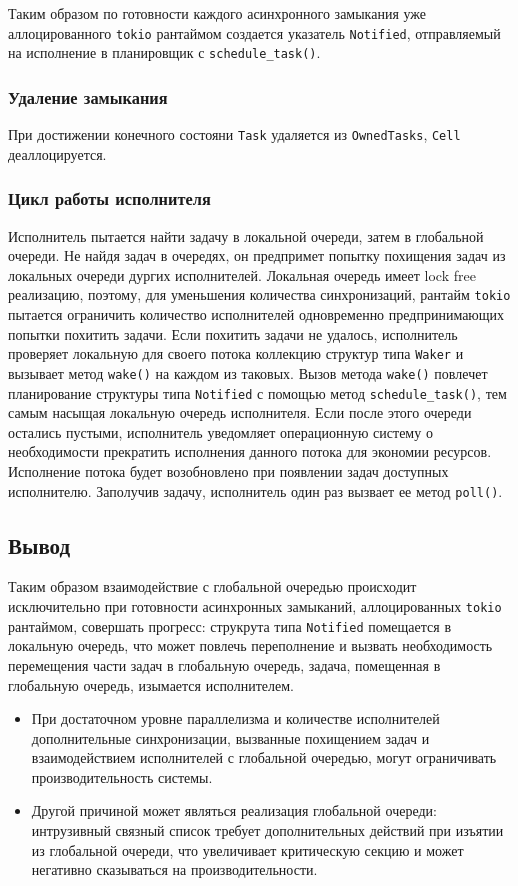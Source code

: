 Таким образом по готовности каждого асинхронного замыкания уже аллоцированного \verb|tokio| рантаймом создается указатель \verb|Notified|, отправляемый на исполнение в планировщик с \verb|schedule_task()|.

\subsubsection{Удаление замыкания}

При достижении конечного состояни \verb|Task| удаляется из \verb|OwnedTasks|, \verb|Cell| деаллоцируется.

\subsubsection{Цикл работы исполнителя}

Исполнитель пытается найти задачу в локальной очереди, затем в глобальной очереди. Не найдя задач в очередях, он предпримет попытку похищения задач из локальных очереди дургих исполнителей. Локальная очередь имеет lock free реализацию, поэтому, для уменьшения количества синхронизаций, рантайм \verb|tokio| пытается ограничить количество исполнителей одновременно предпринимающих попытки похитить задачи. Если похитить задачи не удалось, исполнитель проверяет локальную для своего потока коллекцию структур типа \verb|Waker| и вызывает метод \verb|wake()| на каждом из таковых. Вызов метода \verb|wake()| повлечет планирование структуры типа \verb|Notified| с помощью метод \verb|schedule_task()|, тем самым насыщая локальную очередь исполнителя. Если после этого очереди остались пустыми, исполнитель уведомляет операционную систему о необходимости прекратить исполнения данного потока для экономии ресурсов. Исполнение потока будет возобновлено при появлении задач доступных исполнителю. Заполучив задачу, исполнитель один раз вызвает ее метод \verb|poll()|.

\subsection{Вывод}

Таким образом взаимодействие с глобальной очередью происходит исключительно при готовности асинхронных замыканий, аллоцированных \verb|tokio| рантаймом, совершать прогресс: струкрута типа \verb|Notified| помещается в локальную очередь, что может повлечь переполнение и вызвать необходимость перемещения части задач в глобальную очередь, задача, помещенная в глобальную очередь, изымается исполнителем.

\begin{itemize}
    \item При достаточном уровне параллелизма и количестве исполнителей дополнительные синхронизации, вызванные похищением задач и взаимодействием исполнителей с глобальной очередью, могут ограничивать производительность системы.
    \item Другой причиной может являться реализация глобальной очереди: интрузивный связный список требует дополнительных действий при изъятии из глобальной очереди, что увеличивает критическую секцию и может негативно сказываться на производительности.
\end{itemize}
